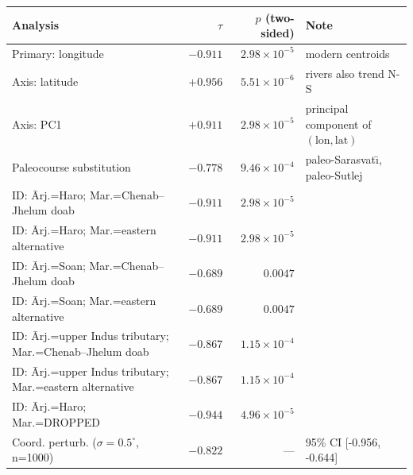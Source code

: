 \begin{tabular}{lrrl}
\toprule
Analysis & $\tau$ & $p$ (two-sided) & Note \\
\midrule
Primary: longitude & $-0.911$ & $2.98\times10^{-5}$ & modern centroids \\
Axis: latitude & $+0.956$ & $5.51\times10^{-6}$ & rivers also trend N-S \\
Axis: PC1 & $+0.911$ & $2.98\times10^{-5}$ & principal component of $(\mathrm{lon},\mathrm{lat})$ \\
Paleocourse substitution & $-0.778$ & $9.46\times10^{-4}$ & paleo-Sarasvat\={\i}, paleo-Sutlej \\
ID: \={A}rj.=Haro; Mar.=Chenab–Jhelum doab & $-0.911$ & $2.98\times10^{-5}$ &  \\
ID: \={A}rj.=Haro; Mar.=eastern alternative & $-0.911$ & $2.98\times10^{-5}$ &  \\
ID: \={A}rj.=Soan; Mar.=Chenab–Jhelum doab & $-0.689$ & $0.0047$ &  \\
ID: \={A}rj.=Soan; Mar.=eastern alternative & $-0.689$ & $0.0047$ &  \\
ID: \={A}rj.=upper Indus tributary; Mar.=Chenab–Jhelum doab & $-0.867$ & $1.15\times10^{-4}$ &  \\
ID: \={A}rj.=upper Indus tributary; Mar.=eastern alternative & $-0.867$ & $1.15\times10^{-4}$ &  \\
ID: \={A}rj.=Haro; Mar.=DROPPED & $-0.944$ & $4.96\times10^{-5}$ &  \\
Coord. perturb. ($\sigma=0.5^\circ$, n=1000) & $-0.822$ & --- & 95\% CI [-0.956, -0.644] \\
\bottomrule
\end{tabular}
